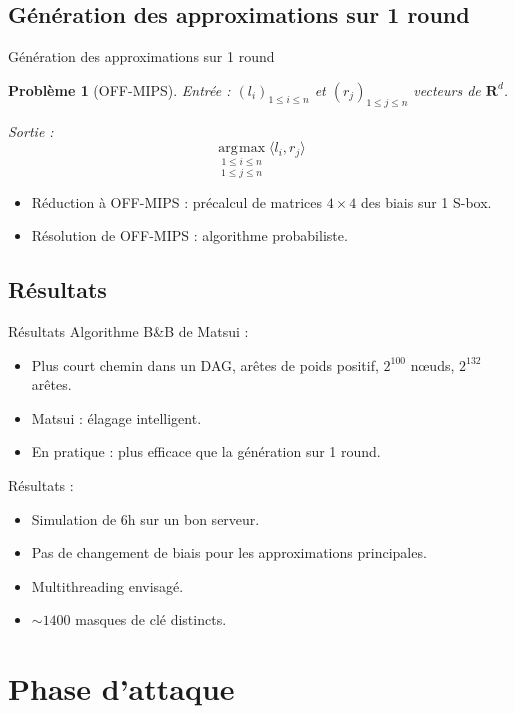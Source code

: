 \documentclass{beamer}
\DeclareMathOperator*{\argmax}{\arg\!\max}
\newtheorem*{Prob}{Problème}
\begin{document}
\subsection{Génération des approximations sur 1 round}
\begin{frame}{Génération des approximations sur 1 round}
	\begin{Prob}[OFF-MIPS]
	Entrée : $(l_i)_{1\le i\le n}$ et $(r_j)_{1\le j\le n}$ vecteurs de $\mathbf{R}^d$.

	Sortie :
		$$\underset{1\le j\le n}{\underset{1\le i\le n}{\argmax}}\langle l_i,r_j\rangle$$
	\end{Prob}

	\begin{itemize}
		\item Réduction à OFF-MIPS : précalcul de matrices $4\times 4$ des biais sur 1 S-box.
		\item Résolution de OFF-MIPS : algorithme probabiliste.
	\end{itemize}
\end{frame}

\subsection{Résultats}
\begin{frame}{Résultats}
	Algorithme B\&B de Matsui :
	\begin{itemize}
		\item Plus court chemin dans un DAG, arêtes de poids positif, $2^{100}$ n\oe{}uds, $2^{132}$ arêtes.
		\item Matsui : élagage intelligent.
		\item En pratique : plus efficace que la génération sur 1 round.
	\end{itemize}
	
	Résultats :
	\begin{itemize}
		\item Simulation de 6h sur un bon serveur.
		\item Pas de changement de biais pour les approximations principales.
		\item Multithreading envisagé.
		\item $\sim 1400$ masques de clé distincts.
	\end{itemize}
\end{frame}

\section{Phase d'attaque}
\begin{frame}
	\tableofcontents[currentsection]
\end{frame}
\end{document}
